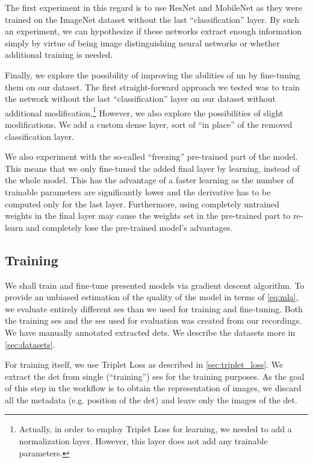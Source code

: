 The first experiment in this regard is to use ResNet and MobileNet as they were trained on the ImageNet dataset without the last ``classification'' layer. By such an experiment, we can hypothesize if these networks extract enough information simply by virtue of being image distinguishing neural networks or whether additional training is needed.

Finally, we explore the possibility of improving the abilities of \gls{nn} by fine-tuning them on our dataset. The first straight-forward approach we tested was to train the network without the last ``classification'' layer on our dataset without additional modification.\footnote{Actually, in order to employ Triplet Loss for learning, we needed to add a normalization layer. However, this layer does not add any trainable parameters.} However, we also explore the possibilities of slight modifications. We add a custom dense layer, sort of ``in place'' of the removed classification layer.

We also experiment with the so-called ``freezing'' pre-trained part of the model. This means that we only fine-tuned the added final layer by learning, instead of the whole model. This has the advantage of a faster learning as the number of trainable parameters are significantly lower and the derivative has to be computed only for the last layer. Furthermore, using completely untrained weights in the final layer may cause the weights set in the pre-trained part to re-learn and completely lose the pre-trained model's advantages.

\subsection{Training}

We shall train and fine-tune presented models via gradient descent algorithm. To provide an unbiased estimation of the quality of the model in terms of \autoref{eq:mla}, we evaluate entirely different \gls{ses} than we used for training and fine-tuning. Both the training \gls{ses} and the \gls{ses} used for evaluation was created from our recordings. We have manually annotated extracted \glspl{det}. We describe the datasets more in \autoref{sec:datasets}.

For training itself, we use Triplet Loss as described in \autoref{sec:triplet_loss}. We extract the \gls{det} from single (``training'') \gls{ses} for the training purposes. As the goal of this step in the workflow is to obtain the representation of images, we discard all the metadata (e.g. position of the \gls{det}) and leave only the images of the \gls{det}.


